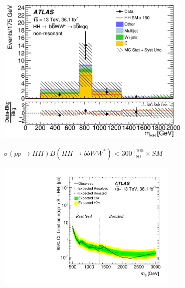 \documentclass{beamer}
\newcommand*{\header}[1]{\fontsize{16}{8}\selectfont \textbf{{\color{MyPurple}{#1}}}}
\begin{document}
\begin{frame}
\begin{center}
\header{Standard Model Results}
\end{center}
\begin{center}
\includegraphics[width=0.7\textwidth]{figures/C_reOptNonRes_mww_bbpt210_bbpt300_wwpt250_mbb_hhMass_regionA_met25d020}
\end{center}
\color{MyPurple}{Production Cross Section 95\% CL}
\small
\vspace{-0.5cm}$\sigma(pp\rightarrow{}HH)B(HH\rightarrow{}b\bar{b}WW^*) < 300^{+100}_{-80} \times{} SM$
\end{frame}

\begin{frame}
\begin{center}
\header{Combined Resonant Production Limit}
\end{center}
\begin{center}
\includegraphics[width=0.65\textwidth]{figures/limit_2016_reOpt_HiggsApproved_Scalar_Paper_Combined_20190312_01}
\end{center}
\end{frame}
\end{document}
